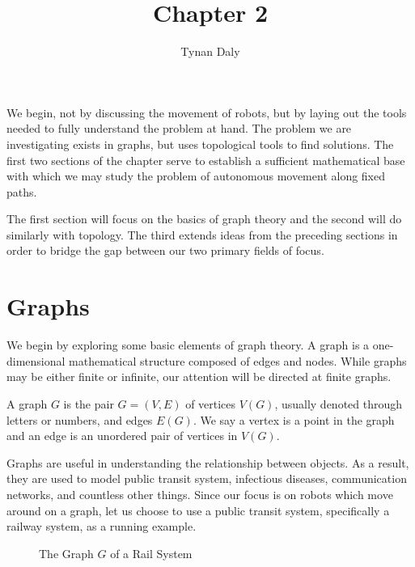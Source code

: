 \documentclass[12pt,oneside]{amsbook}
\title{Chapter 2}
\author{Tynan Daly}
\newenvironment{defn}[1][Definition.]{\begin{trivlist}
\item[\hskip \labelsep {\bfseries #1}]}{\end{trivlist}}
\begin{document}
\maketitle
We begin, not by discussing the movement of robots, but by laying out the tools needed to fully understand the problem at hand. The problem we are investigating exists in graphs, but uses topological tools to find solutions. The first two sections of the chapter serve to establish a sufficient mathematical base with which we may study the problem of autonomous movement along fixed paths.

The first section will focus on the basics of graph theory and the second will do similarly with topology. The third extends ideas from the preceding sections in order to bridge the gap between our two primary fields of focus.

\section{Graphs}\label{sec:graphs}

We begin by exploring some basic elements of graph theory. A graph is a one-dimensional mathematical structure composed of edges and nodes. While graphs may be either finite or infinite, our attention will be directed at finite graphs.

\begin{defn}
A graph $G$ is the pair $G=(V,E)$ of vertices $V(G)$, usually denoted through letters or numbers, and edges $E(G)$. We say a vertex is a point in the graph and an edge is an unordered pair of vertices in $V(G)$\cite{ed}. 
\end{defn}

Graphs are useful in understanding the relationship between objects. As a result, they are used to model public transit system, infectious diseases, communication networks, and countless other things. Since our focus is on robots which move around on a graph, let us choose to use a public transit system, specifically a railway system, as a running example.

\begin{figure}[h!]
\caption{The Graph $G$ of a Rail System}\label{fig:railgraph}
\centering
{}
\end{figure}
\end{document}
